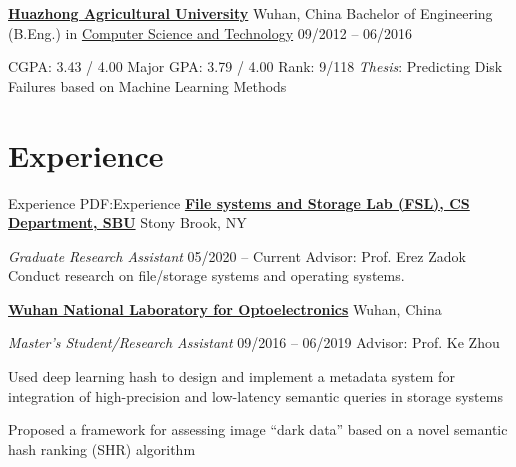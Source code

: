 \documentclass[letterpaper,10pt,oneside]{article}
\begin{document}
\begin{body}
\BigGap
\href{http://www.hzau.edu.cn/en/HOME.htm}
{\textbf{Huazhong Agricultural University}}
\hfill
Wuhan, China
\GapNoBreak
\BulletItem
Bachelor of Engineering (B.Eng.) in
\href{http://coi.hzau.edu.cn/}
{Computer Science and Technology}
\hfill
09/2012 -- 06/2016
\begin{detail}

\SubBulletItem
CGPA: 3.43 / 4.00 \quad Major GPA: 3.79 / 4.00 \quad Rank: 9/118
\SubBulletItem
\emph{Thesis}: Predicting Disk Failures based on Machine Learning Methods
\end{detail}


\section
{Experience}
{Experience}
{PDF:Experience}
\href{https://www.fsl.cs.stonybrook.edu/}
{\textbf{File systems and Storage Lab (FSL), CS Department, SBU}}
\hfill
Stony Brook, NY

\emph{Graduate Research Assistant}
\hfill
05/2020 --
Current
\GapNoBreak
Advisor: Prof. Erez Zadok
\BulletItem
Conduct research on file/storage systems and operating systems.



\BigGap
\href{http://english.wnlo.hust.edu.cn/}
{\textbf{Wuhan National Laboratory for Optoelectronics}}
\hfill
Wuhan, China

\emph{Master's Student/Research Assistant}
\hfill
09/2016 --
06/2019
\GapNoBreak
Advisor: Prof. Ke Zhou

\GapNoBreak
\BulletItem
Used deep learning hash to design and implement a metadata system for integration of high-precision and low-latency semantic queries in storage systems

\GapNoBreak
\BulletItem
Proposed a framework for assessing image ``dark data'' based on a novel semantic hash ranking (SHR) algorithm


\end{body}
\end{document}
